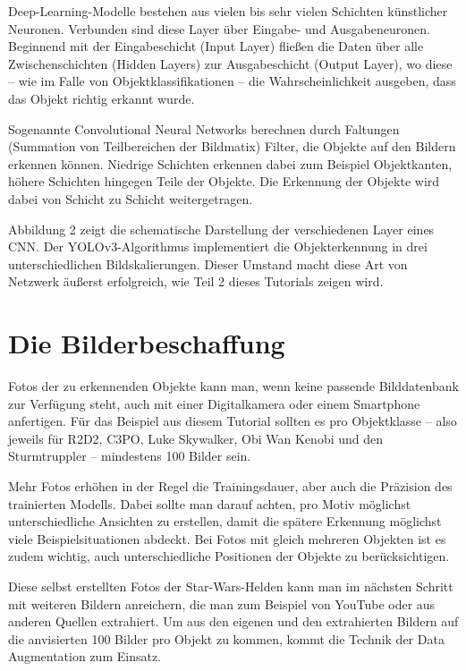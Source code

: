 Deep-Learning-Modelle bestehen aus vielen bis sehr vielen Schichten künstlicher Neuronen. Verbunden sind diese Layer über Eingabe- und Ausgabeneuronen. Beginnend mit der Eingabeschicht (Input Layer) fließen die Daten über alle Zwischenschichten (Hidden Layers) zur Ausgabeschicht (Output Layer), wo diese – wie im Falle von Objektklassifikationen – die Wahrscheinlichkeit ausgeben, dass das Objekt richtig erkannt wurde. 

Sogenannte Convolutional Neural Networks berechnen durch Faltungen (Summation von Teilbereichen der Bildmatix) Filter, die Objekte auf den Bildern erkennen können. Niedrige Schichten erkennen dabei zum Beispiel Objektkanten, höhere Schichten hingegen Teile der Objekte. Die Erkennung der Objekte wird dabei von Schicht zu Schicht weitergetragen. 

Abbildung 2 zeigt die schematische Darstellung der verschiedenen Layer eines CNN. Der YOLOv3-Algorithmus implementiert die Objekterkennung in drei unterschiedlichen Bildskalierungen. Dieser Umstand macht diese Art von Netzwerk äußerst erfolgreich, wie Teil 2 dieses Tutorials zeigen wird. 

\section{Die Bilderbeschaffung}

Fotos der zu erkennenden Objekte kann man, wenn keine passende Bilddatenbank zur Verfügung steht, auch mit einer Digitalkamera oder einem Smartphone anfertigen. Für das Beispiel aus diesem Tutorial sollten es pro Objektklasse – also jeweils für R2D2, C3PO, Luke Skywalker, Obi Wan Kenobi und den Sturmtruppler – mindestens 100 Bilder sein. 

Mehr Fotos erhöhen in der Regel die Trainingsdauer, aber auch die Präzision des trainierten Modells. Dabei sollte man darauf achten, pro Motiv möglichst unterschiedliche Ansichten zu erstellen, damit die spätere Erkennung möglichst viele Beispielsituationen abdeckt. Bei Fotos mit gleich mehreren Objekten ist es zudem wichtig, auch unterschiedliche Positionen der Objekte zu berücksichtigen. 

Diese selbst erstellten Fotos der Star-Wars-Helden kann man im nächsten Schritt mit weiteren Bildern anreichern, die man zum Beispiel von YouTube oder aus anderen Quellen extrahiert. Um aus den eigenen und den extrahierten Bildern auf die anvisierten 100 Bilder pro Objekt zu kommen, kommt die Technik der Data Augmentation zum Einsatz. 

